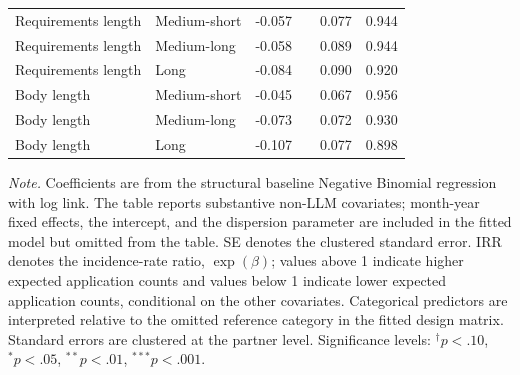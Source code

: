 \begin{table}[htbp]
\begin{tabular}{
@{}
>{\raggedright\arraybackslash}p{2.45cm}
>{\raggedright\arraybackslash}p{4.15cm}
S[table-format=-1.3]
@{}l
S[table-format=1.3]
S[table-format=1.3]
@{}
}
Requirements length & Medium-short & -0.057 &  & 0.077 & 0.944 \\
Requirements length & Medium-long & -0.058 &  & 0.089 & 0.944 \\
Requirements length & Long & -0.084 &  & 0.090 & 0.920 \\

Body length & Medium-short & -0.045 &  & 0.067 & 0.956 \\
Body length & Medium-long & -0.073 &  & 0.072 & 0.930 \\
Body length & Long & -0.107 &  & 0.077 & 0.898 \\
\bottomrule
\end{tabular}

\begin{flushleft}
\footnotesize
\textit{Note.} Coefficients are from the structural baseline Negative Binomial regression with log link. The table reports substantive non-LLM covariates; month-year fixed effects, the intercept, and the dispersion parameter are included in the fitted model but omitted from the table. SE denotes the clustered standard error. IRR denotes the incidence-rate ratio, $\exp(\beta)$; values above 1 indicate higher expected application counts and values below 1 indicate lower expected application counts, conditional on the other covariates. Categorical predictors are interpreted relative to the omitted reference category in the fitted design matrix. Standard errors are clustered at the partner level. Significance levels: $^{\dagger}p < .10$, $^{*}p < .05$, $^{**}p < .01$, $^{***}p < .001$.
\end{flushleft}
\end{table}




